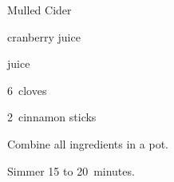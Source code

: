 \begin{recipe}{Mulled Cider\FIXME}{}{}

\begin{ingredients}
\item {} cranberry juice
\item {}  juice
\item 6~cloves
\item 2~cinnamon sticks
\end{ingredients}

\begin{directions}
\item Combine all ingredients in a pot.
\item Simmer 15 to 20~minutes.
\end{directions}

\end{recipe}
